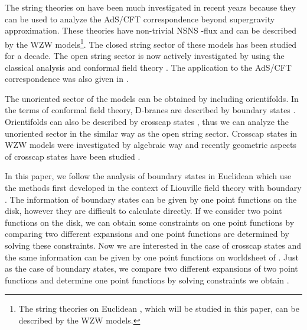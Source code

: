\documentclass[a4paper,12pt]{article}
\providecommand{\br}{\mathbb R}
\providecommand{\bc}{\mathbb C}
\providecommand{\brp}{{\mathbb R \mathbb P}^2}
\begin{document}
The string theories on \coordHE{} have been much investigated in recent years
because they can be used to analyze the AdS/CFT
correspondence \cite{AdSCFT} beyond supergravity approximation.
These theories have non-trivial NSNS \coordHE{}-flux and can be described by the
\myHighlight{$SL(2,\br)$}\coordHE{} WZW models\footnote{The string theories on Euclidean \coordHE{},
which will be studied in this paper, can be described by the \myHighlight{$SL(2,\bc)/SU(2)$}\coordHE{}
WZW models.}.  
The closed string sector of these models has been studied for a decade.
The open string sector is now actively investigated  
by using the classical analysis \cite{Stan2,Stan3,BP,PR,LOPT} and
conformal field theory \cite{GKS,HS,RR,PS,Rajaraman,LOP,PST}.
The application to the AdS/CFT correspondence was also given in
\cite{BBDO}. 

The unoriented sector of the models can be obtained by including
orientifolds. 
In the terms of conformal field theory, D-branes are described by
boundary states \cite{ishibashi,cardy}.
Orientifolds can also be described by crosscap states
\cite{CLNY,Pol}, thus we can analyze the unoriented sector in the
similar way as the open string sector.  
Crosscap states in WZW models were investigated by algebraic
way \cite{sagnotti1,sagnotti2,sagnotti3} and recently geometric
aspects of crosscap states have been studied
\cite{oplane1,oplane2,oplane3,oplane4,pfoplane}. 

In this paper, we follow the analysis of boundary states in Euclidean 
\coordHE{} \cite{GKS,PS,LOP,PST} which use the methods 
first developed in the context of Liouville field theory with
boundary \cite{FZZ,TLB,ZZ,Hos,PT,FH,ARS}. 
The information of boundary states can be given by one point
functions on the disk, however they are difficult to calculate directly. 
If we consider two point functions on the disk, we can obtain some
constraints on one point functions by comparing two different
expansions \cite{sewingbs} and one point functions are determined by
solving these constraints.
Now we are interested in the case of crosscap states and the same information
can be given by one point functions on worldsheet of
\myHighlight{$\brp$}\coordHE{}. Just as the case of boundary states, we compare two
different expansions of two point functions and determine one
point functions by solving constraints we obtain \cite{sewingcs}.
\end{document}

